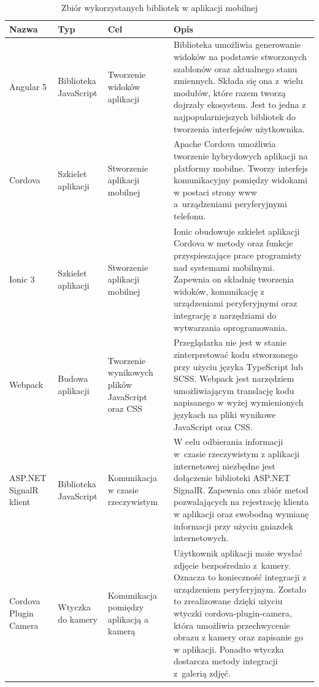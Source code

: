 \begin{center}
	\begin{longtable}{ | p{1.7cm} | p{2cm} | p{3.5cm} | p{6cm} |}
		\caption{Zbiór wykorzystanych bibliotek w aplikacji mobilnej}
		\label{librariesMobile} \\
		\hline Nazwa & Typ  & Cel & Opis \\ \hline    
		
  		\hline Angular 5
  		& Biblioteka JavaScript
		& Tworzenie widoków aplikacji
		& Biblioteka umożliwia generowanie widoków na podstawie stworzonych szablonów oraz aktualnego stanu zmiennych. Składa się ona z~wielu modułów, które razem tworzą dojrzały ekosystem. Jest to jedna z najpopularniejszych bibliotek do tworzenia interfejsów użytkownika.\\ \hline
	
		\hline Cordova
		& Szkielet aplikacji
		& Stworzenie \newline aplikacji mobilnej
		& Apache Cordova umożliwia tworzenie hybrydowych aplikacji na platformy mobilne. Tworzy interfejs komunikacyjny pomiędzy widokami w postaci strony www a~urządzeniami peryferyjnymi telefonu.\\ \hline
		
		\hline Ionic 3
		& Szkielet aplikacji
		& Stworzenie \newline aplikacji mobilnej
		& Ionic obudowuje szkielet aplikacji Cordova w metody oraz funkcje przyspieszające prace programisty nad systemami mobilnymi. Zapewnia on składnię tworzenia widoków, komunikację z urządzeniami peryferyjnymi oraz integrację z narzędziami do wytwarzania oprogramowania.\\ \hline
		
		\hline Webpack
		& Budowa aplikacji
		& Tworzenie wynikowych plików JavaScript oraz CSS
		& Przeglądarka nie jest w stanie zinterpretować kodu stworzonego przy użyciu języka TypeScript lub SCSS. Webpack jest narzędziem umożliwiającym translację kodu napisanego w wyżej wymienionych językach na pliki wynikowe JavaScript oraz CSS. \\ \hline
	
		\hline ASP.NET SignalR klient
		& Biblioteka JavaScript
		& Komunikacja w czasie rzeczywistym
		& W celu odbierania informacji w~czasie rzeczywistym z aplikacji internetowej niezbędne jest dołączenie biblioteki ASP.NET SignalR. Zapewnia ona zbiór metod pozwalających na rejestrację klienta w aplikacji oraz swobodną wymianę informacji przy użyciu gniazdek internetowych. \\ \hline
	
		\hline Cordova Plugin Camera
		& Wtyczka do kamery
		& Komunikacja pomiędzy aplikacją a kamerą
		& Użytkownik aplikacji może wysłać zdjęcie bezpośrednio z~kamery. Oznacza to konieczność integracji z urządzeniem peryferyjnym. Zostało to zrealizowane dzięki użyciu wtyczki cordova-plugin-camera, która umożliwia przechwycenie obrazu z kamery oraz zapisanie go w aplikacji. Ponadto wtyczka dostarcza metody integracji z~galerią zdjęć.\\ \hline
	\end{longtable}
\end{center}

